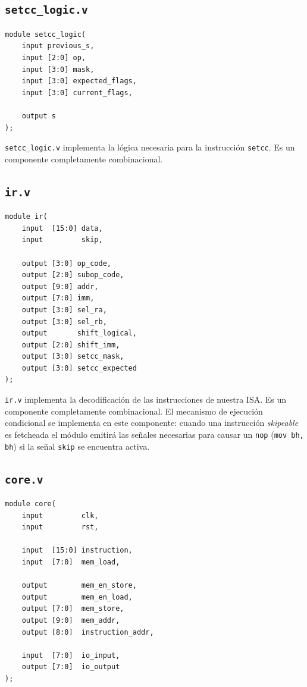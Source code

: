 \documentclass{article}
\begin{document}
\subsection{\texttt{setcc\_logic.v}}
\begin{verbatim}
module setcc_logic(
    input previous_s,
    input [2:0] op,
    input [3:0] mask,
    input [3:0] expected_flags,
    input [3:0] current_flags,

    output s
);
\end{verbatim}
\texttt{setcc\_logic.v} implementa la lógica necesaria para la instrucción \texttt{setcc}. Es un componente completamente combinacional.

\subsection{\texttt{ir.v}}
\begin{verbatim}
module ir(
    input  [15:0] data,
    input         skip,

    output [3:0] op_code,
    output [2:0] subop_code,
    output [9:0] addr,
    output [7:0] imm,
    output [3:0] sel_ra,
    output [3:0] sel_rb,
    output       shift_logical,
    output [2:0] shift_imm,
    output [3:0] setcc_mask,
    output [3:0] setcc_expected
);
\end{verbatim}
\texttt{ir.v} implementa la decodificación de las instrucciones de nuestra ISA. Es un componente completamente combinacional. El mecanismo de ejecución condicional se implementa en este componente: cuando una instrucción \emph{skipeable} es fetcheada el módulo emitirá las señales necesarias para causar un \texttt{nop} (\texttt{mov bh, bh}) si la señal \texttt{skip} se encuentra activa.

\subsection{\texttt{core.v}}
\begin{verbatim}
module core(
    input         clk,
    input         rst,

    input  [15:0] instruction,
    input  [7:0]  mem_load,

    output        mem_en_store,
    output        mem_en_load,
    output [7:0]  mem_store,
    output [9:0]  mem_addr,
    output [8:0]  instruction_addr,

    input  [7:0]  io_input,
    output [7:0]  io_output
);
\end{verbatim}
\end{document}
